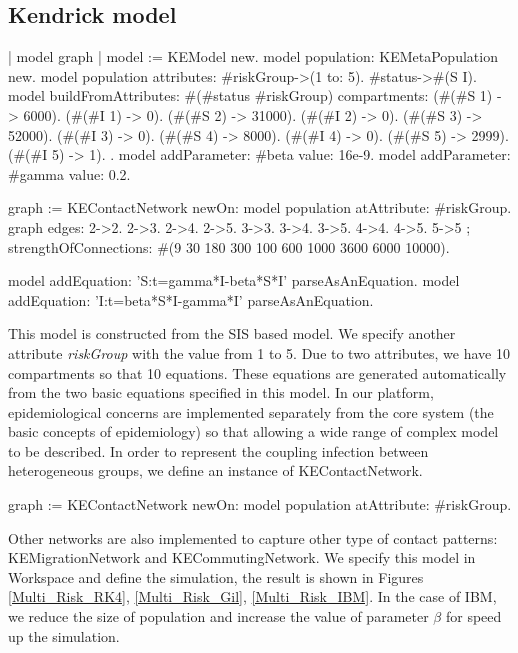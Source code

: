 \documentclass[a4paper,10pt,twoside]{book}
\begin{document}
\subsection{ Kendrick model}

\begin{code}{}
| model graph |
	model := KEModel new.
	model population: KEMetaPopulation new.
	model population attributes: {#riskGroup->(1 to: 5). #status->#(S I)}.
	model
		buildFromAttributes: #(#status #riskGroup)
		compartments: {
		  (#(#S 1) -> 6000). (#(#I 1) -> 0).
        (#(#S 2) -> 31000). (#(#I 2) -> 0).
        (#(#S 3) -> 52000). (#(#I 3) -> 0).
        (#(#S 4) -> 8000). (#(#I 4) -> 0).
        (#(#S 5) -> 2999). (#(#I 5) -> 1).
		}.
	model addParameter: #beta value: 16e-9.
	model addParameter: #gamma value: 0.2.

	graph := KEContactNetwork
					newOn: model population
					atAttribute: #riskGroup.
	graph edges: { 2->2. 2->3. 2->4. 2->5. 3->3. 3->4. 3->5. 4->4. 4->5. 5->5 };
			strengthOfConnections: #(9 30 180 300 100 600 1000 3600 6000 10000).

	model addEquation: 'S:t=gamma*I-beta*S*I' parseAsAnEquation.
	model addEquation: 'I:t=beta*S*I-gamma*I' parseAsAnEquation.
\end{code}

This model is constructed from the SIS based model. We specify another attribute \textit{riskGroup} with the value from 1 to 5.
Due to two attributes, we have 10 compartments so that 10 equations.
These equations are generated automatically from the two basic equations specified in this model.
In our platform, epidemiological concerns are implemented separately from the core system (the basic concepts of epidemiology) so that allowing a wide range of complex model to be described.
In order to represent the coupling infection between heterogeneous groups, we define an instance of KEContactNetwork.


\begin{code}{}
graph := KEContactNetwork
        newOn: model population
        atAttribute: #riskGroup.
\end{code}

Other networks are also implemented to capture other type of contact patterns: KEMigrationNetwork and KECommutingNetwork.
We specify this model in Workspace and define the simulation, the result is shown in Figures \ref{Multi_Risk_RK4}, \ref{Multi_Risk_Gil}, \ref{Multi_Risk_IBM}.
In the case of IBM, we reduce the size of population and increase the value of parameter  $\beta$ for speed up the simulation.
\end{document}
